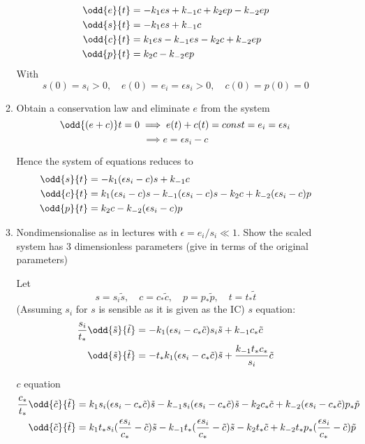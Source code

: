 \documentclass{X:/Documents/Coding/Latex/myassignment}
\begin{document}
\begin{enumerate}
\begin{enumerate}
		\begin{align*}
			\odd{e}{t} &= -k_1es + k_{-1}c +k_2ep - k_{-2}ep\\
			\odd{s}{t} &= -k_1 es + k_{-1}c\\
			\odd{c}{t} &= k_1 es - k_{-1} es - k_2 c + k_{-2}ep\\
			\odd{p}{t} &= k_2 c - k_{-2} ep
		\end{align*}
		With
		\[s(0) = s_i >0 ,\quad e(0) = e_i = \epsilon s_i > 0, \quad c(0) = p(0) = 0\]


		\item Obtain a conservation law and eliminate $e$ from the system
		\[\odd{(e+c)}t = 0 \implies e(t) + c(t) = const = e_i = \epsilon s_i\]
		\[\implies e = \epsilon s_i - c\]

		Hence the system of equations reduces to 
		\begin{align*}
			\odd{s}{t} &= -k_1 (\epsilon s_i - c)s + k_{-1}c\\
			\odd{c}{t} &= k_1 (\epsilon s_i - c)s - k_{-1} (\epsilon s_i - c)s - k_2 c + k_{-2} (\epsilon s_i - c)p\\
			\odd{p}{t} &= k_2 c - k_{-2} (\epsilon s_i - c)p
		\end{align*}

		\item Nondimensionalise as in lectures with $\epsilon = e_i/s_i \ll 1$. Show the scaled system has 3 dimensionless parameters (give in terms of the original parameters)

		Let
		\[s = s_i \tilde{s}, \quad c = c_*\tilde{c}, \quad p = p_*\tilde{p},\quad  t = t_*\tilde{t}\]
		(Assuming $s_i$ for $s$ is sensible as it is given as the IC)
		$s$ equation:
		\begin{align*}
			\frac{s_i}{t_*}\odd{\tilde s}{\tilde t} &= -k_1 (\epsilon s_i - c_*\tilde{c})s_i\tilde{s} + k_{-1}c_*\tilde{c}\\
			\odd{\tilde s}{\tilde t} &= -t_*k_1 (\epsilon s_i - c_*\tilde{c})\tilde{s} + \frac{k_{-1}t_*c_*}{s_i}\tilde{c}\\
		\end{align*}

		$c$ equation
		\begin{align*}
			\frac{c_*}{t_*} \odd{\tilde c}{\tilde t} &= k_1 s_i (\epsilon s_i - c_*\tilde{c})\tilde{s} - k_{-1} s_i (\epsilon s_i - c_*\tilde{c})\tilde{s} - k_2 c_*\tilde{c} + k_{-2} (\epsilon s_i - c_*\tilde{c})p_*\tilde{p}\\
			\odd{\tilde c}{\tilde t} &= k_1 t_*s_i(\frac{\epsilon s_i}{c_*} - \tilde{c})\tilde{s} - k_{-1}t_* (\frac{\epsilon s_i}{c_*} - \tilde{c})\tilde{s} - k_2 t_*\tilde{c} + k_{-2}t_*p_* (\frac{\epsilon s_i}{c_*} - \tilde{c})\tilde{p}\\
		\end{align*}


\end{enumerate}
\end{enumerate}
\end{document}
